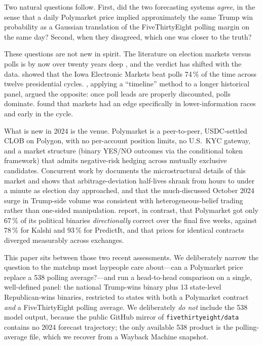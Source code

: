 \documentclass{article}
\begin{document}
Two natural questions follow. First, did the two forecasting systems
\emph{agree}, in the sense that a daily Polymarket price implied
approximately the same Trump win probability as a Gaussian translation of
the FiveThirtyEight polling margin on the same day? Second, when they
disagreed, which one was closer to the truth?

These questions are not new in spirit. The literature on election markets
versus polls is by now over twenty years deep
\citep{berg2008results,wolfers2004prediction,rothschild2009forecasting,erikson2012markets},
and the verdict has shifted with the data. \citet{berg2008results} showed
that the Iowa Electronic Markets beat polls 74\,\% of the time across
twelve presidential cycles. \citet{erikson2012markets}, applying a
``timeline'' method to a longer historical panel, argued the opposite: once
poll leads are properly discounted, polls dominate. \citet{rothschild2009forecasting}
found that markets had an edge specifically in lower-information races and
early in the cycle.

What is new in 2024 is the venue. Polymarket is a peer-to-peer, USDC-settled
CLOB on Polygon, with no per-account position limits, no U.S.\ KYC
gateway, and a market structure (binary YES/NO outcomes via the conditional
token framework) that admits negative-risk hedging across mutually exclusive
candidates. Concurrent work by \citet{tsang2026anatomy} documents the
microstructural details of this market and shows that
arbitrage-deviation half-lives shrank from hours to under a minute as
election day approached, and that the much-discussed October 2024 surge in
Trump-side volume was consistent with heterogeneous-belief trading rather
than one-sided manipulation. \citet{clinton2025prediction} report, in
contrast, that Polymarket got only 67\,\% of its political binaries
\emph{directionally} correct over the final five weeks, against 78\,\% for
Kalshi and 93\,\% for PredictIt, and that prices for identical contracts
diverged measurably across exchanges.

This paper sits between those two recent assessments. We deliberately
narrow the question to the matchup most laypeople care about---can a
Polymarket price replace a 538 polling average?---and run a head-to-head
comparison on a single,
well-defined panel: the national Trump-wins binary plus 13 state-level
Republican-wins binaries, restricted to states with both a Polymarket
contract \emph{and} a FiveThirtyEight polling average. We deliberately
\emph{do not} include the 538 model output, because the public GitHub
mirror of \texttt{fivethirtyeight/data} contains no 2024 forecast
trajectory; the only available 538 product is the polling-average file,
which we recover from a Wayback Machine snapshot.
\end{document}
